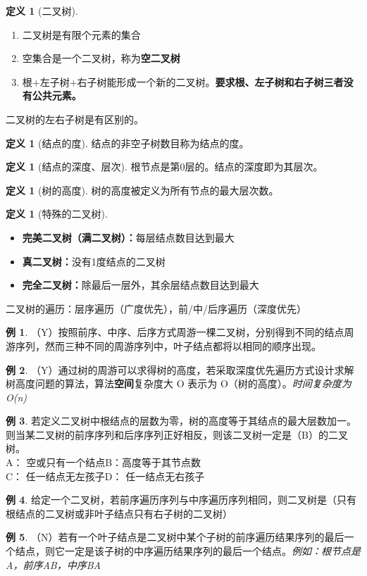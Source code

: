 \documentclass[hyperref,a4paper,UTF8,12pt]{ctexart}
\theoremstyle{definition}
\newtheorem{definition}[theorem]{定义}
\newtheorem{example}{例}[section]
\begin{document}
\begin{definition}[二叉树]
\ 
\begin{enumerate}
    \item 二叉树是有限个元素的集合
    \item 空集合是一个二叉树，称为\textbf{空二叉树}
    \item 根+左子树+右子树能形成一个新的二叉树。\textbf{要求根、左子树和右子树三者没有公共元素。}
\end{enumerate}
\end{definition}
二叉树的左右子树是有区别的。
\begin{definition}[结点的度]
    结点的非空子树数目称为结点的度。
\end{definition}
\begin{definition}[结点的深度、层次]
    根节点是第0层的。结点的深度即为其层次。
\end{definition}
\begin{definition}[树的高度]
    树的高度被定义为所有节点的最大层次数。
\end{definition}
\begin{definition}[特殊的二叉树]
\ 
\begin{itemize}
    \item \textbf{完美二叉树（满二叉树）：}每层结点数目达到最大
    \item \textbf{真二叉树：}没有1度结点的二叉树
    \item \textbf{完全二叉树：}除最后一层外，其余层结点数目达到最大
\end{itemize}    
\end{definition}
二叉树的遍历：层序遍历（广度优先），前/中/后序遍历（深度优先）
\begin{example}
    （Y）按照前序、中序、后序方式周游一棵二叉树，分别得到不同的结点周游序列，然而三种不同的周游序列中，叶子结点都将以相同的顺序出现。
\end{example}
\begin{example}
    （Y）通过树的周游可以求得树的高度，若采取深度优先遍历方式设计求解树高度问题的算法，算法\textbf{空间}复杂度大 O 表示为 O（树的高度）。\quad\textit{时间复杂度为O(n)}
\end{example}
\begin{example}
    若定义二叉树中根结点的层数为零，树的高度等于其结点的最大层数加一。则当某二叉树的前序序列和后序序列正好相反，则该二叉树一定是（B）的二叉树。\\
A： 空或只有一个结点\quad B：高度等于其节点数\\
C： 任一结点无左孩子\quad D： 任一结点无右孩子
\end{example}
\begin{example}
    给定一个二叉树，若前序遍历序列与中序遍历序列相同，则二叉树是（只有根结点的二叉树或非叶子结点只有右子树的二叉树）
\end{example}
\begin{example}
    （N）若有一个叶子结点是二叉树中某个子树的前序遍历结果序列的最后一个结点，则它一定是该子树的中序遍历结果序列的最后一个结点。\quad \textit{例如：根节点是A，前序AB，中序BA}
\end{example}
\end{document}
